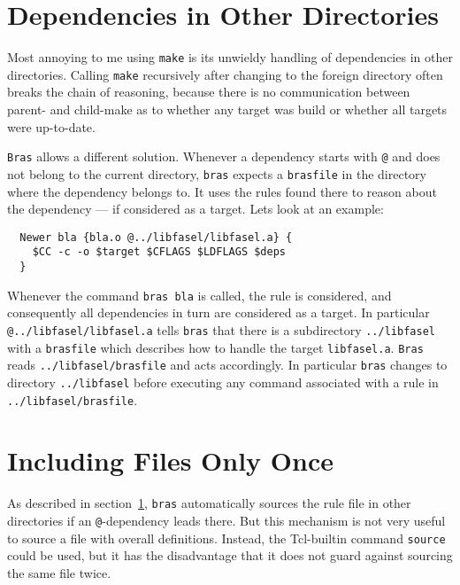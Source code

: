 \documentclass[12pt]{article}
\newcommand{\bras}{\texttt{bras}}
\newcommand{\Bras}{\texttt{Bras}}
\newcommand{\make}{\texttt{make}}
\begin{document}
\section{Dependencies in Other Directories}
\label{secForeignDeps}

Most annoying to me using \make{} is its unwieldy handling of
dependencies in other directories. Calling \make{} recursively after
changing to the foreign directory often breaks the chain of reasoning,
because there is no communication between parent- and child-make as to
whether any target was build or whether all targets were up-to-date.

\Bras{} allows a different solution. Whenever a dependency starts with
\texttt{@} and does not belong to the current directory, \bras{} expects
a \texttt{brasfile} in the directory where the dependency belongs
to. It uses the rules found there to reason about the dependency ---
if considered as a target. Lets look at an example:

\begin{verbatim}
  Newer bla {bla.o @../libfasel/libfasel.a} {
    $CC -c -o $target $CFLAGS $LDFLAGS $deps
  }
\end{verbatim}

Whenever the command \texttt{bras bla} is called, the rule is
considered, and consequently all dependencies in turn are considered
as a target. In particular \texttt{@../libfasel/libfasel.a} tells
\bras{} that there is a subdirectory \texttt{../libfasel} with a
\texttt{brasfile} which describes how to handle the target
\texttt{libfasel.a}.  \Bras{} reads \texttt{../libfasel/bras\-file}
and acts accordingly.  In particular \bras{} changes to directory
\texttt{../libfasel} before executing any command associated with a
rule in \texttt{../libfasel/brasfile}.

\section{Including Files Only Once}
\label{secInclude}

As described in section~\ref{secForeignDeps}, \bras{} automatically
sources the rule file in other directories if an \texttt{@}-dependency
leads there. But this mechanism is not very useful to source a file
with overall definitions. Instead, the Tcl-builtin command
\texttt{source} could be used, but it has the disadvantage that it
does not guard against sourcing the same file twice.
\end{document}
